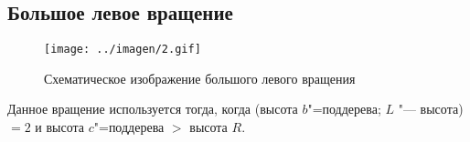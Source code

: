 \begin{frame}
    \subsection*{Большое левое вращение}

    \begin{figure}[ht]
    \texttt{[image: ../imagen/2.gif]}

    \caption{Схематическое изображение большого левого вращения}
    \end{figure}

    Данное вращение используется тогда,
    когда (высота $b$"=поддерева; $L$ "--- высота)
    $= 2$ и высота $c$"=поддерева $>$ высота $R$.
\end{frame}